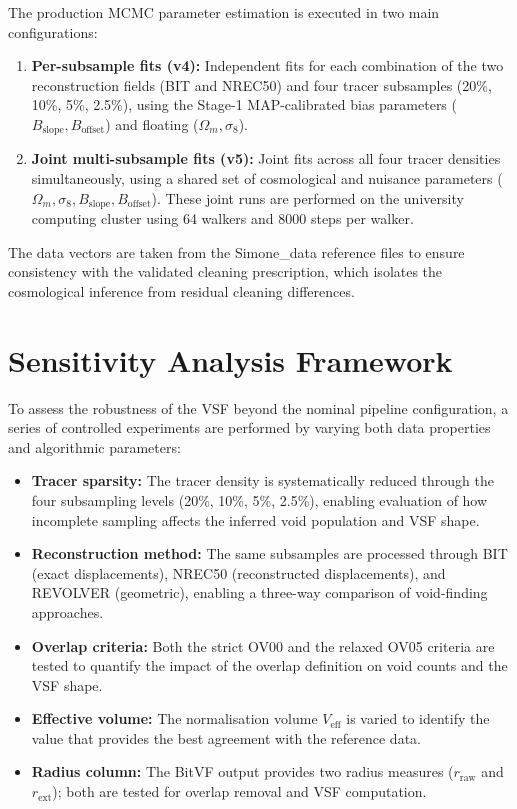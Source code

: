 \documentclass[12pt]{report}
\begin{document}
The production MCMC parameter estimation is executed in two main configurations:
\begin{enumerate}
    \item \textbf{Per-subsample fits (v4):} Independent fits for each combination of the two reconstruction fields (BIT and NREC50) and four tracer subsamples (20\%, 10\%, 5\%, 2.5\%), using the Stage-1 MAP-calibrated bias parameters ($B_{\mathrm{slope}}, B_{\mathrm{offset}}$) and floating ($\Omega_m, \sigma_8$).
    \item \textbf{Joint multi-subsample fits (v5):} Joint fits across all four tracer densities simultaneously, using a shared set of cosmological and nuisance parameters ($\Omega_m, \sigma_8, B_{\mathrm{slope}}, B_{\mathrm{offset}}$). These joint runs are performed on the university computing cluster using 64 walkers and 8000 steps per walker.
\end{enumerate}

The data vectors are taken from the Simone\_data reference files to ensure consistency with the validated cleaning prescription, which isolates the cosmological inference from residual cleaning differences.


\section{Sensitivity Analysis Framework}
\label{sec:sensitivity}

To assess the robustness of the VSF beyond the nominal pipeline configuration, a series of controlled experiments are performed by varying both data properties and algorithmic parameters:

\begin{itemize}
    \item \textbf{Tracer sparsity:} The tracer density is systematically reduced through the four subsampling levels (20\%, 10\%, 5\%, 2.5\%), enabling evaluation of how incomplete sampling affects the inferred void population and VSF shape.

    \item \textbf{Reconstruction method:} The same subsamples are processed through BIT (exact displacements), NREC50 (reconstructed displacements), and REVOLVER (geometric), enabling a three-way comparison of void-finding approaches.

    \item \textbf{Overlap criteria:} Both the strict OV00 and the relaxed OV05 criteria are tested to quantify the impact of the overlap definition on void counts and the VSF shape.

    \item \textbf{Effective volume:} The normalisation volume $V_\mathrm{eff}$ is varied to identify the value that provides the best agreement with the reference data.

    \item \textbf{Radius column:} The BitVF output provides two radius measures ($r_\mathrm{raw}$ and $r_\mathrm{ext}$); both are tested for overlap removal and VSF computation.
\end{itemize}
\end{document}
